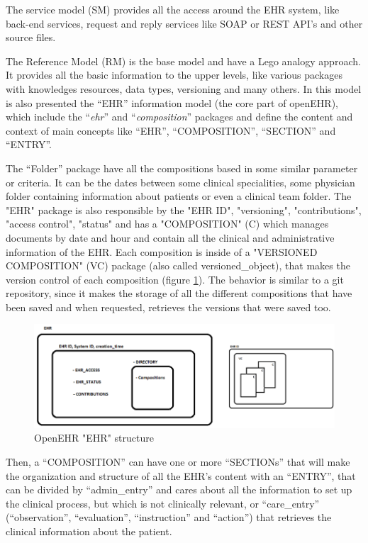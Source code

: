 \documentclass[mim_thesis.tex]{subfiles}
\begin{document}
The service model (SM) provides all the access around the EHR system, like back-end services, request and reply services like \ac{SOAP} or \ac{REST} \ac{API}’s and other source files.
	
The Reference Model (RM) is the base model and have a Lego\texttrademark{ } analogy approach. It provides all the basic information to the upper levels, like various packages with knowledges resources, data types, versioning and many others. In this model is also presented the “EHR” information model (the core part of openEHR), which include the “\textit{ehr}” and “\textit{composition}” packages and define the content and context of main concepts like “EHR”, “COMPOSITION”, “SECTION” and “ENTRY”.

The “Folder” package have all the compositions based in some similar parameter or criteria. It can be the dates between some clinical specialities, some physician folder containing information about patients or even a clinical team folder. The "EHR" package is also responsible by the "EHR ID", "versioning", "contributions", "access control", "status" and has a "COMPOSITION" (C) which manages documents by date and hour and contain all the clinical and administrative information of the EHR. Each composition is inside of a "VERSIONED COMPOSITION" (VC) package (also called versioned\_object), that makes the version control of each composition (figure \ref{fig:openehr_structure}). The behavior is similar to a git repository, since it makes the storage of all the different compositions that have been saved and when requested, retrieves the versions that were saved too.


\begin{figure}[H]
	\centering
    \includegraphics[width=1.1\textwidth]{img/openehr_structure.PNG}
	\caption{OpenEHR "EHR" structure}
	\label{fig:openehr_structure}
\end{figure}

Then, a “COMPOSITION” can have one or more “SECTIONs” that will make the organization and structure of all the EHR’s content with an “ENTRY”, that can be divided by “admin\_entry” and cares about all the information to set up the clinical process, but which is not clinically relevant, or “care\_entry” (“observation”, “evaluation”, “instruction” and “action”) that retrieves the clinical information about the patient.
\end{document}
